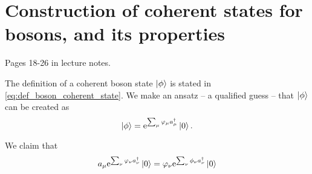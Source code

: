 \section{Construction of coherent states for bosons, and its properties}

Pages 18-26 in lecture notes.

The definition of a coherent boson state $\ket{\phi}$ is stated in \eqref{eq:def_boson_coherent_state}. We make an ansatz -- a qualified guess -- that $\ket{\phi}$ can be created as
\begin{equation}
\label{eq:construction_coherent_boson}
\ket{\phi} = \mathrm{e}^{\sum_\mu\varphi_\mu a_\mu^\dagger}\ket{0}.
\end{equation}

We claim that 
\begin{equation}
\label{unc:indices}
a_\mu\mathrm{e}^{\sum_\nu\varphi_\nu a_\nu^\dagger}\ket{0} = \varphi_\nu\mathrm{e}^{\sum_\nu\phi_\nu a_\nu^\dagger}\ket{0}
\end{equation} %

